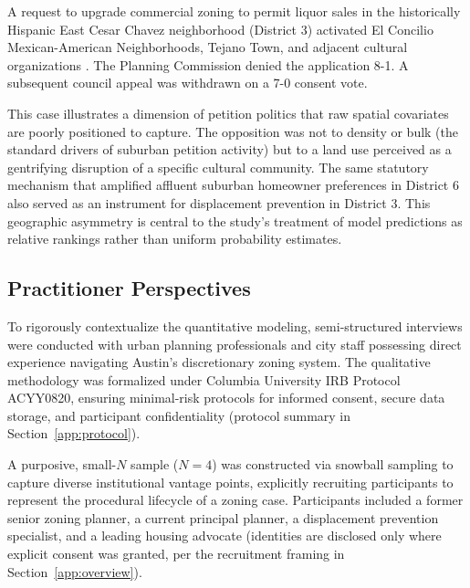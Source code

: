 A request to upgrade commercial zoning to permit liquor sales in the historically Hispanic East Cesar Chavez neighborhood (District 3) activated El Concilio Mexican-American Neighborhoods, Tejano Town, and adjacent cultural organizations \cite{case_c14_2008_0247}. The Planning Commission denied the application 8-1. A subsequent council appeal was withdrawn on a 7-0 consent vote.

This case illustrates a dimension of petition politics that raw spatial covariates are poorly positioned to capture. The opposition was not to density or bulk (the standard drivers of suburban petition activity) but to a land use perceived as a gentrifying disruption of a specific cultural community. The same statutory mechanism that amplified affluent suburban homeowner preferences in District 6 also served as an instrument for displacement prevention in District 3. This geographic asymmetry is central to the study's treatment of model predictions as relative rankings rather than uniform probability estimates.

\subsection{Practitioner Perspectives}
\label{subsec:interviews}

To rigorously contextualize the quantitative modeling, semi-structured interviews were conducted with urban planning professionals and city staff possessing direct experience navigating Austin's discretionary zoning system. The qualitative methodology was formalized under Columbia University IRB Protocol ACYY0820, ensuring minimal-risk protocols for informed consent, secure data storage, and participant confidentiality (protocol summary in Section~\ref{app:protocol}).

A purposive, small-$N$ sample ($N=4$) was constructed via snowball sampling to capture diverse institutional vantage points, explicitly recruiting participants to represent the procedural lifecycle of a zoning case. Participants included a former senior zoning planner, a current principal planner, a displacement prevention specialist, and a leading housing advocate (identities are disclosed only where explicit consent was granted, per the recruitment framing in Section~\ref{app:overview}).

